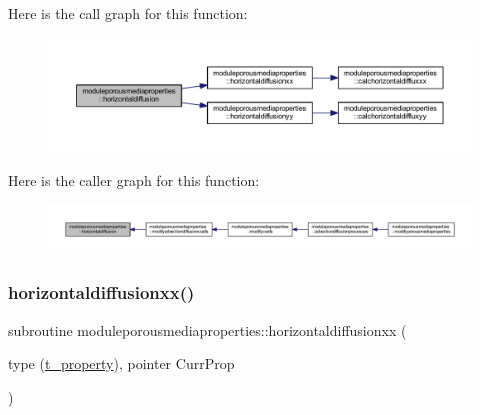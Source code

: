 Here is the call graph for this function\+:\nopagebreak
\begin{figure}[H]
\begin{center}
\leavevmode
\includegraphics[width=350pt]{namespacemoduleporousmediaproperties_a46d137d0c183e1c9fcad5f72b1101ffd_cgraph}
\end{center}
\end{figure}
Here is the caller graph for this function\+:\nopagebreak
\begin{figure}[H]
\begin{center}
\leavevmode
\includegraphics[width=350pt]{namespacemoduleporousmediaproperties_a46d137d0c183e1c9fcad5f72b1101ffd_icgraph}
\end{center}
\end{figure}
\mbox{\label{namespacemoduleporousmediaproperties_a3a2fc7f94588508e3f73f83cdb76a6af}} 
\subsubsection{\texorpdfstring{horizontaldiffusionxx()}{horizontaldiffusionxx()}}
{\footnotesize\ttfamily subroutine moduleporousmediaproperties\+::horizontaldiffusionxx (\begin{DoxyParamCaption}\item[{type (\mbox{\hyperlink{structmoduleporousmediaproperties_1_1t__property}{t\+\_\+property}}), pointer}]{Curr\+Prop }\end{DoxyParamCaption})\hspace{0.3cm}{\ttfamily [private]}}

